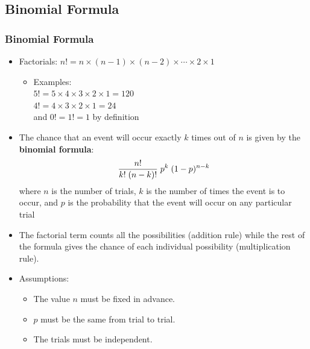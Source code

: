\documentclass[t]{beamer}
\begin{document}
\subsection{Binomial Formula}
\begin{frame}
\frametitle{Binomial Formula}
{\footnotesize
\begin{itemize}
\item Factorials:  $n!=n\times (n-1)\times (n-2)\times \cdots \times 2 \times 1$\vspace{-2pt}
  \begin{itemize}
  \item \footnotesize Examples:\\
       $5!=5\times 4\times 3\times 2\times 1 = 120$\\
       $4!=4\times 3\times 2\times 1 = 24$\\
       and $0! = 1! = 1$ by definition
  \end{itemize}
\item The chance that an event will occur exactly $k$ times out of $n$ is given by the 
\textbf{binomial formula}:\vspace{-3pt}
\[\frac{n!}{k!\;(n-k)!}\; p^k\; (1-p)^{n-k}\vspace{3pt}\]
where $n$ is the number of trials, $k$ is the number of times the event is to occur, and
$p$ is the probability that the event will occur on any particular trial
\item The factorial term counts all the possibilities (addition rule) while the rest of the formula
    gives the chance of each individual possibility (multiplication rule).
\item Assumptions:\vspace{-1pt}
  \begin{itemize}
  \item \footnotesize The value $n$ must be fixed in advance.
  \item \footnotesize $p$ must be the same from trial to trial.
  \item \footnotesize The trials must be independent.
  \end{itemize}
\end{itemize}
}
\end{frame}
\end{document}
